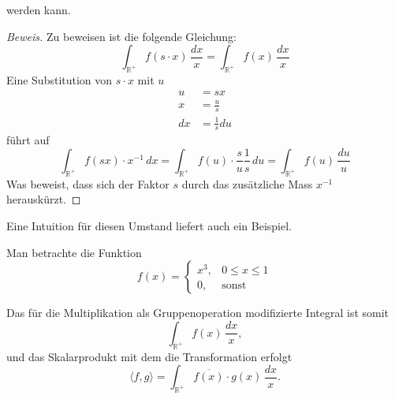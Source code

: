 werden kann.
\begin{proof}[Beweis]
    Zu beweisen ist die folgende Gleichung:
    \[
        \int_\mathbb{R^+} f(s \cdot x)\,\frac{dx}{x} = \int_\mathbb{R^+} f(x)\,\frac{dx}{x}
    \]
    Eine Substitution von $s \cdot x$ mit $u$
    \[
    \begin{aligned}
        u &= sx \\
        x &= \frac{u}{s} \\
        dx &= \frac{1}{s} du
    \end{aligned}
    \]
    führt auf
    \[
        \int_\mathbb{R^+} f(sx) \cdot x^{-1}\,dx = \int_\mathbb{R^+} f(u) \cdot \frac{s}{u} \frac{1}{s}\,du 
        = \int_\mathbb{R^+} f(u)\,\frac{du}{u}
    \]
    Was beweist, dass sich der Faktor $s$ durch das zusätzliche Mass $x^{-1}$ herauskürzt. 
\end{proof}
Eine Intuition für diesen Umstand liefert auch ein Beispiel.
\begin{beispiel}
Man betrachte die Funktion 
\[
f(x) = \begin{cases}
    x^3, & 0\leq x\leq 1\\
    0, & \text{sonst}
\end{cases}
\]
\end{beispiel}
Das für die Multiplikation als Gruppenoperation modifizierte Integral ist somit
\begin{equation}
    \int_\mathbb{R^+} f(x)\,\frac{dx}{x},
\end{equation}
und das Skalarprodukt mit dem die Transformation erfolgt
\begin{equation}
    \langle f,g \rangle = \int_\mathbb{R^+} \overline{f(x)} \cdot g(x) \,\frac{dx}{x}.
\end{equation}






